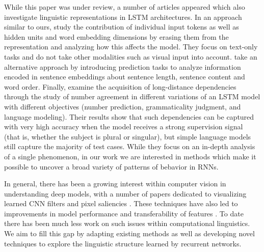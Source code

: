 While this paper was under review, a number of articles appeared which also
investigate linguistic representations in LSTM architectures. In an
approach similar to ours, \cite{li2016understanding} study the contribution of
individual input tokens as well as hidden units and word embedding dimensions
by erasing them from the representation and analyzing how this affects the model.
They focus on text-only tasks and do not take other 
modalities such as visual input into account.
\cite{adi2016fine} take an alternative approach by introducing prediction tasks
to analyze information encoded in sentence embeddings about sentence length,
sentence content and word order.
Finally, \cite{linzen2016assessing} examine
the acquisition of long-distance dependencies through the study of number agreement
in different variations of an LSTM model with different objectives (number prediction,
grammaticality judgment, and language modeling). Their results show that such dependencies
can be captured with very high accuracy when the model receives a strong supervision
signal (that is, whether the subject is plural or singular), but simple language models still capture
the majority of test cases. While they focus on an in-depth analysis of a single phenomenon, in our work
we are interested in methods which make it possible to uncover a broad variety of patterns of bebavior in RNNs.

In general, there has been a growing interest within computer vision
in understanding deep models, with a number of papers dedicated to
visualizing learned CNN filters and pixel saliencies
\citep{simonyan2013deep,yosinski2015understanding,mahendran2015understanding}. These
techniques have also led to improvements in model performance
\citep{eigen2013understanding} and transferability of features
\citep{zhou2014object}. To date there has been much less work on such
issues within computational linguistics. We aim to fill this gap by
adapting existing methods as well as developing novel techniques to
explore the linguistic structure learned by recurrent networks.
